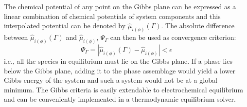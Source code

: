 	The chemical potential of any point on the Gibbs plane can be expressed as a linear combination of  chemical potentials of system components and this interpolated potential can be denoted by $\hat{\mu}_{i(\phi)}(\Gamma)$. The absolute difference between $\hat{\mu}_{i(\phi)}(\Gamma)$ and $\hat{\mu}_{i(\phi)}$, $\Psi_{\Gamma}$ can then be used as convergence criterion:
		\begin{equation}\label{eqn:convGC}
			\Psi_{\Gamma} = \left \vert  \hat{\mu}_{i(\phi)}(\Gamma) - \hat{\mu}_{i(\phi)} \right \vert < \epsilon
		\end{equation}
	 i.e., all the species in equilibrium must lie on the Gibbs plane. If a phase lies below the Gibbs plane, adding it to the phase assemblage would yield a lower Gibbs energy of the system and such a system would not be at a global minimum. The Gibbs criteria is easily extendable to electrochemical equilibrium and can be conveniently implemented in a thermodynamic equilibrium	 solver.

